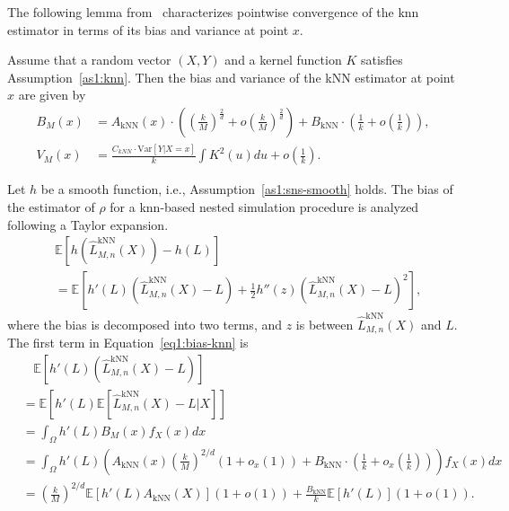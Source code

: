 The following lemma from~\cite{mack1981local} characterizes pointwise convergence of the \gls{knn} estimator in terms of its bias and variance at point $x$.

\begin{lemma}
    Assume that a random vector $(X, Y)$ and a kernel function $K$ satisfies Assumption~\ref{as1:knn}. Then the bias and variance of the kNN estimator at point $x$ are given by
    \begin{align*}
        B_M(x) & = A_{\text{kNN}}(x) \cdot \left( \left( \frac{k}{M} \right)^\frac{2}{d} + o \left( \frac{k}{M} \right)^\frac{2}{d} \right) + B_{\text{kNN}} \cdot \left(\frac{1}{k} + o\left(\frac{1}{k}\right)\right), \\
        V_M(x) & = \frac{C_{kNN} \cdot \text{Var}[Y| X = x]}{k} \int K^2(u) du + o\left(\frac{1}{k}\right).
    \end{align*}
\end{lemma}

Let $h$ be a smooth function, i.e., Assumption~\ref{as1:sns-smooth} holds.
The bias of the estimator of $\rho$ for a \gls{knn}-based nested simulation procedure is analyzed following a Taylor expansion.
\begin{align}\label{eq1:bias-knn}
    & \mathbb{E} \left[ h(\hat{L}^{\text{kNN}}_{M, n}(X)) - h(L) \right] \nonumber \\
    & = \mathbb{E} \left[ h'(L) \left( \hat{L}^{\text{kNN}}_{M, n}(X) - L \right) + \frac{1}{2} h''(z) \left( \hat{L}^{\text{kNN}}_{M, n}(X) - L \right)^2 \right],
\end{align}
where the bias is decomposed into two terms, and $z$ is between $\hat{L}^{\text{kNN}}_{M, n}(X)$ and $L$.
The first term in Equation~\eqref{eq1:bias-knn} is 
\begin{align}\label{eq1:bias-knn-1}
    & ~~~~ \mathbb{E} \left[ h'(L) \left( \hat{L}^{\text{kNN}}_{M, n}(X) - L \right) \right]  \nonumber \\
    & = \mathbb{E} \left[ h'(L) \mathbb{E}\left[ \hat{L}^{\text{kNN}}_{M, n}(X) - L |X\right] \right] \nonumber \\
    & = \int_{\Omega} h'(L) B_M(x) f_X(x) dx \nonumber \\
    & = \int_{\Omega} h'(L) \left( A_{\text{kNN}}(x) \left(\frac{k}{M}\right)^{2/d} \left(1+o_x(1)\right) + B_{\text{kNN}} \cdot \left(\frac{1}{k} + o_x\left(\frac{1}{k}\right)\right) \right) f_X(x) dx \nonumber \\
    & = \left(\frac{k}{M}\right)^{2/d} \mathbb{E} \left[ h'(L) A_{\text{kNN}}(X) \right] (1+ o(1)) + \frac{B_{\text{kNN}}}{k} \mathbb{E} \left[ h'(L) \right] (1+ o(1)).
\end{align}

